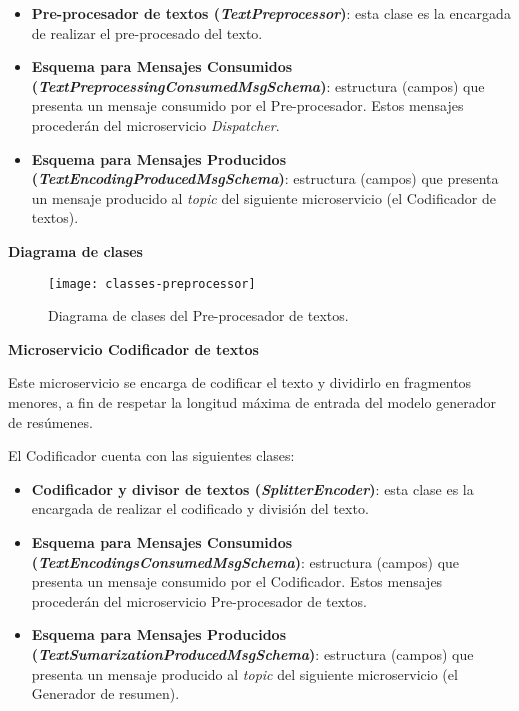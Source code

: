 \vspace{-0.2cm}
\begin{itemize} [\textbullet]
	\item \textbf{Pre-procesador de textos (\emph{TextPreprocessor})}: esta clase es la encargada de realizar el pre-procesado del texto.
	
	\item \textbf{Esquema para Mensajes Consumidos \\ (\emph{TextPreprocessingConsumedMsgSchema})}: estructura (campos) que presenta un mensaje consumido por el Pre-procesador. Estos mensajes procederán del microservicio \emph{Dispatcher}.
	
	\item \textbf{Esquema para Mensajes Producidos \\ (\emph{TextEncodingProducedMsgSchema})}: estructura (campos) que presenta un mensaje producido al \emph{topic} del siguiente microservicio (el Codificador de textos).
\end{itemize}

\noindent
\textbf{Diagrama de clases}

\begin{figure}[h]
	\centering
	\texttt{[image: classes-preprocessor]}
	\vspace{-0.5cm}
	\caption{Diagrama de clases del Pre-procesador de textos.}
\end{figure}

\newpage

\noindent
\textbf{\large Microservicio Codificador de textos}

Este microservicio se encarga de codificar el texto y dividirlo en fragmentos menores, a fin de respetar la longitud máxima de entrada del modelo generador de resúmenes.

El Codificador cuenta con las siguientes clases:

\vspace{-0.2cm}
\begin{itemize} [\textbullet]
	\item \textbf{Codificador y divisor de textos (\emph{SplitterEncoder})}: esta clase es la encargada de realizar el codificado y división del texto.
	
	\item \textbf{Esquema para Mensajes Consumidos \\ (\emph{TextEncodingsConsumedMsgSchema})}: estructura (campos) que presenta un mensaje consumido por el Codificador. Estos mensajes procederán del microservicio Pre-procesador de textos.
	
	\item \textbf{Esquema para Mensajes Producidos \\ (\emph{TextSumarizationProducedMsgSchema})}: estructura (campos) que presenta un mensaje producido al \emph{topic} del siguiente microservicio (el Generador de resumen).
\end{itemize}

